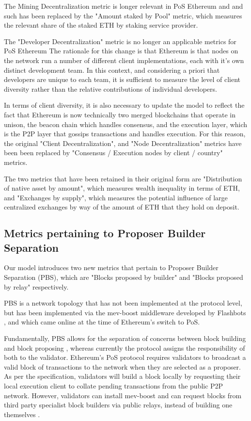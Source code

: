 \documentclass[conference]{IEEEtran}
\begin{document}
The Mining Decentralization metric is longer relevant in PoS Ethereum and and such has been replaced by the "Amount staked by Pool" metric, which measures the relevant share of the staked ETH by staking service provider. 

The "Developer Decentralization" metric is no longer an applicable metrics for PoS Ethereum The rationale for this  change is that Ethereum is that nodes on the network run a number of different client implementations, each with it's own distinct development team.  In this context, and considering a priori that developers are unique to each team, it is sufficient to measure the level of client diversity rather than the relative contributions of individual developers. 

In terms of client diversity, it is also necessary to update the model to reflect the fact that Ethereum is now technically two merged blockchains that operate in unison, the beacon chain which handles consensus, and the execution layer, which is the P2P layer that gossips transactions and handles execution.  For this reason, the original "Client Decentralization", and "Node Decentralization" metrics have been been replaced by "Consensus / Execution nodes by client / country" metrics. 

The two metrics that have been retained in their original form are "Distribution of native asset by amount", which measures wealth inequality in terms of ETH, and "Exchanges by supply", which measures the potential influence of large centralized exchanges by way of the amount of ETH that they hold on deposit.

\subsection{Metrics pertaining to Proposer Builder Separation}

Our model introduces two new metrics that pertain to Proposer Builder Separation (PBS), which are "Blocks proposed by builder" and "Blocks proposed by relay" respectively.

PBS is a network topology that has not been implemented at the protocol level, but has been implemented via the mev-boost middleware developed by Flashbots \cite{gosselin2021}, and which came online at the time of Ethereum's switch to PoS.

Fundamentally, PBS allows for the separation of concerns between block building and block proposing \cite{ethereum2023}, whereas currently the protocol assigns the responsibility of both to the validator.  Ethereum's PoS protocol requires validators to broadcast a valid block of transactions to the network when they are selected as a proposer.  As per the specification, validators will build a block locally by requesting their local execution client to collate pending transactions from the public P2P network. However, validators can install mev-boost and can request blocks from third party specialist block builders via public relays, instead of building one themselves \cite{ethereum2022}.
\end{document}
